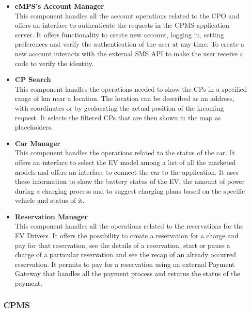 \begin{itemize}
    \item \textbf{eMPS's Account Manager} \\ This component handles all the account operations related to the CPO and offers an interface to authenticate
          the requests in the CPMS application server.
          It offers functionality to create new account, logging in, setting preferences and verify the authentication of the user at any time.
          To create a new account interacts with the external SMS API to make the user receive a code to verify the identity.
    \item \textbf{CP Search} \\ This component handles the operations needed to show the CPs in a specified range of km near a location. The location
        can be described as an address, with coordinates or by geolocating the actual position of the incoming request. It selects the filtered CPs that are then 
        shown in the map as placeholders.  
    \item \textbf{Car Manager} \\ This component handles the operations related to the status of the car. It offers an interface to select the EV model among a list of 
        all the marketed models and offers an interface to connect the car to the application. It uses these information to show the battery status of the EV, the 
        amount of power during a charging process and to suggest charging plans based on the specific vehicle and status of it.
    \item \textbf{Reservation Manager} \\ This component handles all the operations related to the reservations for the EV Drivers. It offers the possibility to create a reservation
    for a charge and pay for that reservation, see the details of a reservation, start or pause a charge of a particular reservation and see the recap of an already occurred reservation.
    It permits to pay for a reservation using an external Payment Gateway that handles all the payment process and returns the status of the payment.  

\end{itemize}


\subsubsection{CPMS}

